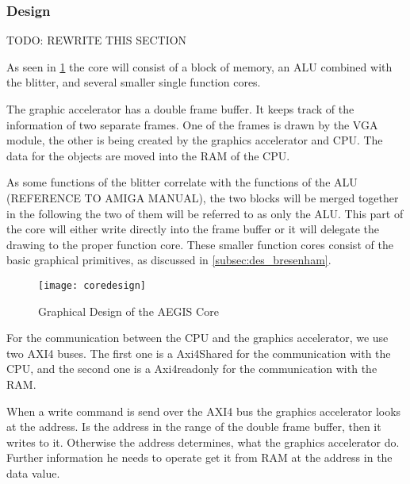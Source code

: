 \subsubsection*{Design}
TODO: REWRITE THIS SECTION

As seen in \cref{img:coredes} the core will consist of a block of memory, an ALU combined with the blitter, and several smaller single function cores.

The graphic accelerator has a double frame buffer. It keeps track of the information of two separate frames. One of the frames is drawn by the VGA module, the other is being created by the graphics accelerator and CPU. The data for the objects are moved into the RAM of the CPU.

As some functions of the blitter correlate with the functions of the ALU (REFERENCE TO AMIGA MANUAL), the two blocks will be merged together in the following the two of them will be referred to as only the ALU. This part of the core will either write directly into the frame buffer or it will delegate the drawing to the proper function core. These smaller function cores consist of the basic graphical primitives, as discussed in \cref{subsec:des_bresenham}.
\begin{figure}[H]
	\centering
	\texttt{[image: coredesign]}
	\caption{Graphical Design of the AEGIS Core }
	\label{img:coredes}
\end{figure}

For the communication between the CPU and the graphics accelerator, we use two AXI4 buses. The first one is a Axi4Shared for the communication with the CPU, and the second one is a Axi4readonly for the communication with the RAM.

When a write command is send over the AXI4 bus the graphics accelerator looks at the address. Is the address in the range of the double frame buffer, then it writes to it. Otherwise the address determines, what the graphics accelerator do. Further information he needs to operate get it from RAM at the address in the data value. 

